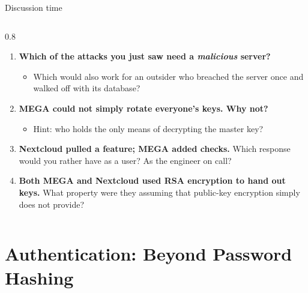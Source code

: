 \ifdefined\PRESENTATION\else\PassOptionsToClass{handout}{beamer}\fi\documentclass[aspectratio=169, lualatex]{beamer}
\begin{document}
\begin{frame}{Discussion time}
	\begin{columns}[c]
		\begin{column}{0.8\textwidth}
			\begin{enumerate}
				\item \textbf{Which of the attacks you just saw need a \textit{malicious} server?}
				      \begin{itemize}
					      \item Which would also work for an outsider who breached the server once and walked off with its database?
				      \end{itemize}
				\item \textbf{MEGA could not simply rotate everyone's keys. Why not?}
				      \begin{itemize}
					      \item Hint: who holds the only means of decrypting the master key?
				      \end{itemize}
				\item \textbf{Nextcloud pulled a feature; MEGA added checks.} Which response would you rather have as a user? As the engineer on call?
				\item \textbf{Both MEGA and Nextcloud used RSA encryption to hand out keys.} What property were they assuming that public-key encryption simply does not provide?
			\end{enumerate}
		\end{column}
	\end{columns}
\end{frame}

\section{Authentication: Beyond Password Hashing}
\end{document}
